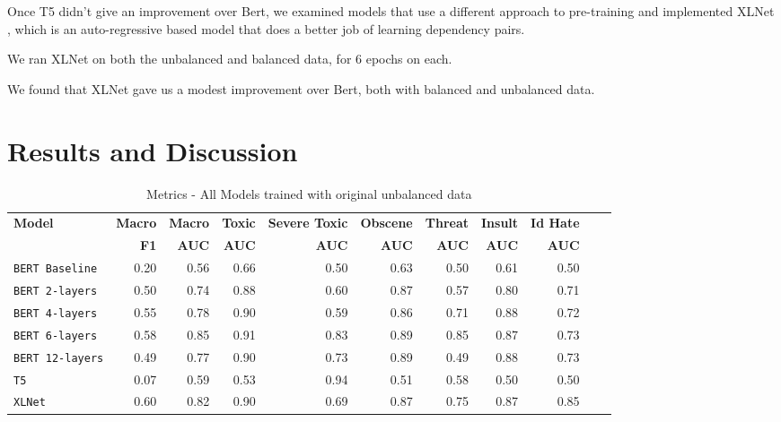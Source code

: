 \documentclass[11pt,a4paper]{article}
\begin{document}
Once T5 didn't give an improvement over Bert, we examined models that use a different approach to pre-training and implemented XLNet \cite{yang2019xlnet}, which is an auto-regressive based model that does a better job of learning dependency pairs.

We ran XLNet on both the unbalanced and balanced data, for 6 epochs on each.

We found that XLNet gave us a modest improvement over Bert, both with balanced and unbalanced data.

\FloatBarrier
\section{Results and Discussion}

\begin{table}

\centering
\begin{tabular}{lrrrrrrrrrr}
\hline
\textbf{Model} & \textbf{Macro} & \textbf{Macro} & \textbf{Toxic} & \textbf{Severe Toxic} & \textbf{Obscene} & \textbf{Threat} & \textbf{Insult} & \textbf{Id Hate}
\\
\textbf{ } & \textbf{F1} & \textbf{AUC} & \textbf{AUC} & \textbf{AUC} & \textbf{AUC} & \textbf{AUC} & \textbf{AUC} & \textbf{AUC}\\
\hline
\verb|BERT Baseline|&0.20 & 0.56 & 0.66 & 0.50 & 0.63 & 0.50 & 0.61 & 0.50 \\
\verb|BERT 2-layers| & 0.50 & 0.74 & 0.88 & 0.60 & 0.87 & 0.57 & 0.80 & 0.71 \\
\verb|BERT 4-layers| & 0.55 & 0.78 & 0.90 & 0.59 & 0.86 & 0.71 & 0.88 & 0.72 \\
\verb|BERT 6-layers| & 0.58 & 0.85 & 0.91 & 0.83 & 0.89 & 0.85 & 0.87 & 0.73 \\
\verb|BERT 12-layers| & 0.49 & 0.77 & 0.90 & 0.73 & 0.89 & 0.49 & 0.88 & 0.73 \\
\verb|T5| & 0.07 & 0.59 & 0.53 & 0.94 & 0.51 & 0.58 & 0.50 & 0.50 \\
\verb|XLNet| & 0.60 & 0.82 & 0.90 & 0.69 & 0.87 & 0.75 & 0.87 & 0.85 \\
\hline
\end{tabular}
\caption{Metrics - All Models trained with original unbalanced data}
\label{table:UnBalResults}
\end{table}
\end{document}

